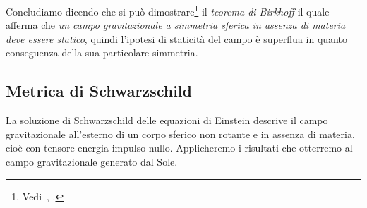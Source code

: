 Concludiamo dicendo che si può
dimostrare\footnote{Vedi~\textcite[390-393]{landau:campi},
  \textcite[335-337]{weinberg:gravitation}.}
il \emph{teorema di Birkhoff} il quale afferma che
\emph{un campo gravitazionale a simmetria sferica in assenza di materia deve
  essere statico},
quindi l'ipotesi di staticità del campo è superflua in quanto conseguenza della
sua particolare simmetria.

\subsection{Metrica di Schwarzschild}
\label{sec:metrica-schwarzschild}

La soluzione di Schwarzschild delle equazioni di Einstein descrive il campo
gravitazionale all'esterno di un corpo sferico non rotante e in assenza di
materia, cioè con tensore energia-impulso nullo.  Applicheremo i risultati che
otterremo al campo gravitazionale generato dal Sole.

